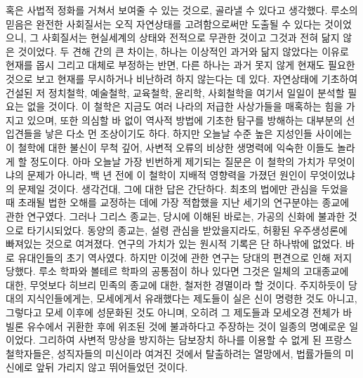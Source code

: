 혹은 사법적 정화를 거쳐서 보여줄 수 있는 것으로,
골라낼 수 있다고 생각했다.
루소의 믿음은 완전한 사회질서는 오직 자연상태를 고려함으로써만
도출될 수 있다는 것이었으니, 그 사회질서는
현실세계의 상태와 전적으로 무관한 것이고 그것과 전혀 닮지 않은 것이었다.
두 견해 간의 큰 차이는, 하나는
이상적인 과거와 닮지 않았다는 이유로 현재를 몹시 그리고 대체로 부정하는 반면,
다른 하나는 과거 못지 않게 현재도 필요한 것으로 보고 현재를 무시하거나
비난하려 하지 않는다는 데 있다.
자연상태에 기초하여 건설된 저 정치철학, 예술철학, 교육철학,
윤리학, 사회철학을 여기서 일일이 분석할 필요는 없을 것이다.
이 철학은 지금도 여러 나라의 저급한 사상가들을 매혹하는 힘을 가지고 있으며,
또한 의심할 바 없이 역사적 방법에 기초한 탐구를 방해하는
대부분의 선입견들을 낳은 다소 먼 조상이기도 하다.
하지만 오늘날 수준 높은 지성인들 사이에는 이 철학에 대한 불신이 무척 깊어,
사변적 오류의 비상한 생명력에 익숙한 이들도 놀라게 할 정도이다.
아마 오늘날 가장 빈번하게 제기되는 질문은 이 철학의 가치가 무엇이냐의 문제가
아니라, 백 년 전에 이 철학이 지배적 영향력을 가졌던 원인이
무엇이었냐의 문제일 것이다.
생각건대, 그에 대한 답은 간단하다.
최초의 법에만 관심을 두었을 때 초래될 법한 오해를 교정하는 데에
가장 적합했을 지난 세기의 연구분야는 종교에 관한 연구였다.
그러나 그리스 종교는, 당시에 이해된 바로는, 가공의 신화에 불과한 것으로
타기시되었다.
동양의 종교는, 설령 관심을 받았을지라도, 허황된 우주생성론에
빠져있는 것으로 여겨졌다.
연구의 가치가 있는 원시적 기록은 단 하나밖에 없었다.
바로 유대인들의 초기 역사였다.
하지만 이것에 관한 연구는 당대의 편견으로 인해 저지당했다.
루소 학파와 볼테르 학파의 공통점이 하나 있다면 그것은
일체의 고대종교에 대한, 무엇보다 히브리 민족의 종교에 대한,
철저한 경멸이라 할 것이다.
주지하듯이 당대의 지식인들에게는, 모세에게서 유래했다는 제도들이
실은 신이 명령한 것도 아니고, 그렇다고 모세 이후에 성문화된 것도 아니며,
오히려 그 제도들과 모세오경 전체가
바빌론 유수에서 귀환한 후에 위조된 것에 불과하다고
주장하는 것이 일종의 명예로운 일이었다.
그리하여 사변적 망상을 방지하는 담보장치 하나를 이용할 수 없게 된
프랑스 철학자들은, 성직자들의 미신이라 여겨진 것에서 탈출하려는 열망에서,
법률가들의 미신에로 앞뒤 가리지 않고 뛰어들었던 것이다.

